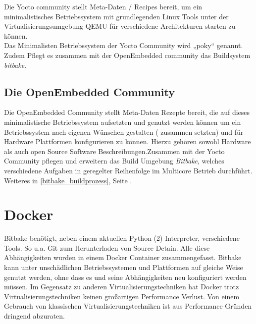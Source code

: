 Die Yocto community stellt Meta-Daten / Recipes bereit, um ein
minimalistisches Betriebssystem mit grundlegenden  Linux Tools unter der
Virtualisierungsumgebung QEMU für verschiedene Architekturen starten zu können.
\\

Das Minimalisten Betriebssystem der Yocto Community wird „poky“ genannt.
\\

Zudem Pflegt es zusammen mit der OpenEmbedded community das Buildsystem
\textit{bitbake}.

\subsection{Die OpenEmbedded Community}%
\label{sub:die_openembedded_community}


Die OpenEmbedded Community stellt Meta-Daten Rezepte bereit, die auf dieses
minimalistische Betriebssystem aufsetzten und genutzt werden können um ein
Betriebssystem nach eigenen Wünschen gestalten ( zusammen setzten) und für
Hardware Plattformen konfigurieren zu können. Hierzu gehören sowohl Hardware als
auch open Source Software Beschreibungen.Zusammen mit der Yocto Community
 pflegen und erweitern das Build Umgebung \textit{Bitbake}, welches
 verschiedene Aufgaben in geregelter Reihenfolge im Multicore Betrieb
 durchführt. Weiteres in \ref{bitbake_buildprozess}, Seite
 \pageref{bitbake_buildprozess}.




\section{Docker} \label{sec:docker}
Bitbake benötigt, neben einem aktuellen Python (2) Interpreter, verschiedene
Tools. So u.a. Git zum Herunterladen von Source Detain. Alle diese
Abhängigkeiten wurden in einem \gls{Docker} Container zusammengefasst. Bitbake
kann unter unschädlichen Betriebssystemen und Plattformen auf gleiche Weise
genutzt werden, ohne dass es und seine Abhängigkeiten neu konfiguriert werden
müssen.  Im Gegensatz zu anderen Virtualisierungstechniken hat Docker trotz
Virtualisierungstechniken keinen großartigen Performance Verlust.  Von einem
Gebrauch von klassischen Virtualisierungstechniken ist aus Performance Gründen
dringend abzuraten.



